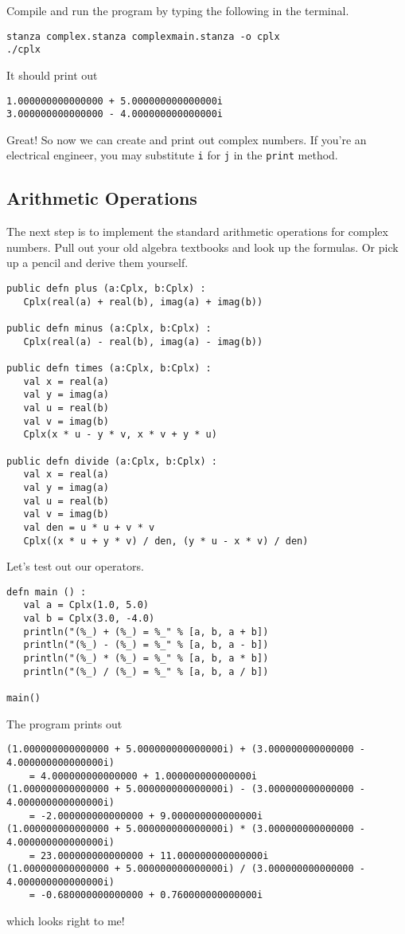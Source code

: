 \documentclass[10pt,oneside]{book}
\begin{document}
Compile and run the program by typing the following in the terminal.
\begin{lstlisting}
stanza complex.stanza complexmain.stanza -o cplx
./cplx
\end{lstlisting}
It should print out
\begin{lstlisting}
1.000000000000000 + 5.000000000000000i
3.000000000000000 - 4.000000000000000i
\end{lstlisting}

Great! So now we can create and print out complex numbers. If you're an electrical engineer, you may substitute \texttt{\frenchspacing i} for \texttt{\frenchspacing j} in the \texttt{\frenchspacing print} method.

 \subsection*{Arithmetic Operations}
The next step is to implement the standard arithmetic operations for complex numbers. Pull out your old algebra textbooks and look up the formulas. Or pick up a pencil and derive them yourself. 
\begin{lstlisting}
public defn plus (a:Cplx, b:Cplx) :
   Cplx(real(a) + real(b), imag(a) + imag(b))

public defn minus (a:Cplx, b:Cplx) :
   Cplx(real(a) - real(b), imag(a) - imag(b))

public defn times (a:Cplx, b:Cplx) :
   val x = real(a)
   val y = imag(a)
   val u = real(b)
   val v = imag(b)
   Cplx(x * u - y * v, x * v + y * u)

public defn divide (a:Cplx, b:Cplx) :
   val x = real(a)
   val y = imag(a)
   val u = real(b)
   val v = imag(b)
   val den = u * u + v * v
   Cplx((x * u + y * v) / den, (y * u - x * v) / den)
\end{lstlisting}

Let's test out our operators.
\begin{lstlisting}
defn main () :
   val a = Cplx(1.0, 5.0)
   val b = Cplx(3.0, -4.0)
   println("(%_) + (%_) = %_" % [a, b, a + b])
   println("(%_) - (%_) = %_" % [a, b, a - b])
   println("(%_) * (%_) = %_" % [a, b, a * b])
   println("(%_) / (%_) = %_" % [a, b, a / b])

main()
\end{lstlisting}
The program prints out
\begin{lstlisting}
(1.000000000000000 + 5.000000000000000i) + (3.000000000000000 - 4.000000000000000i)
    = 4.000000000000000 + 1.000000000000000i
(1.000000000000000 + 5.000000000000000i) - (3.000000000000000 - 4.000000000000000i)
    = -2.000000000000000 + 9.000000000000000i
(1.000000000000000 + 5.000000000000000i) * (3.000000000000000 - 4.000000000000000i)
    = 23.000000000000000 + 11.000000000000000i
(1.000000000000000 + 5.000000000000000i) / (3.000000000000000 - 4.000000000000000i)
    = -0.680000000000000 + 0.760000000000000i
\end{lstlisting}
which looks right to me!
\end{document}
